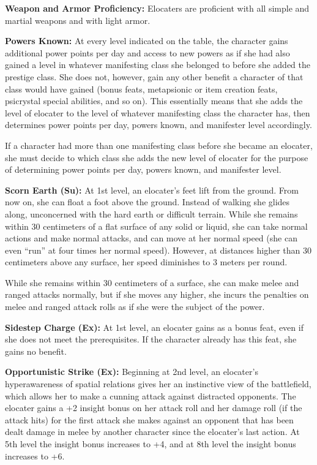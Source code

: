 {
\textbf{Weapon and Armor Proficiency:} Elocaters are proficient with all simple and martial weapons and with light armor.

\textbf{Powers Known:} At every level indicated on the table, the character gains additional power points per day and access to new powers as if she had also gained a level in whatever manifesting class she belonged to before she added the prestige class. She does not, however, gain any other benefit a character of that class would have gained (bonus feats, metapsionic or item creation feats, psicrystal special abilities, and so on). This essentially means that she adds the level of elocater to the level of whatever manifesting class the character has, then determines power points per day, powers known, and manifester level accordingly.

If a character had more than one manifesting class before she became an elocater, she must decide to which class she adds the new level of elocater for the purpose of determining power points per day, powers known, and manifester level.

\textbf{Scorn Earth (Su):} At 1st level, an elocater's feet lift from the ground. From now on, she can float a foot above the ground. Instead of walking she glides along, unconcerned with the hard earth or difficult terrain. While she remains within 30 centimeters of a flat surface of any solid or liquid, she can take normal actions and make normal attacks, and can move at her normal speed (she can even ``run'' at four times her normal speed). However, at distances higher than 30 centimeters above any surface, her speed diminishes to 3 meters per round.

While she remains within 30 centimeters of a surface, she can make melee and ranged attacks normally, but if she moves any higher, she incurs the penalties on melee and ranged attack rolls as if she were the subject of the  power.

\textbf{Sidestep Charge (Ex):} At 1st level, an elocater gains  as a bonus feat, even if she does not meet the prerequisites. If the character already has this feat, she gains no benefit.

\textbf{Opportunistic Strike (Ex):} Beginning at 2nd level, an elocater's hyperawareness of spatial relations gives her an instinctive view of the battlefield, which allows her to make a cunning attack against distracted opponents. The elocater gains a +2 insight bonus on her attack roll and her damage roll (if the attack hits) for the first attack she makes against an opponent that has been dealt damage in melee by another character since the elocater's last action. At 5th level the insight bonus increases to +4, and at 8th level the insight bonus increases to +6.

}

